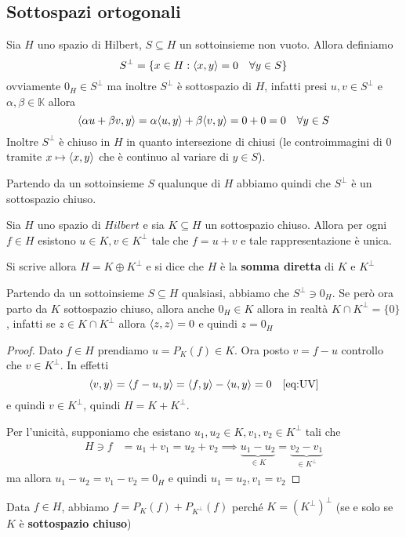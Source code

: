 \subsection{Sottospazi ortogonali}
Sia \(H\) uno spazio di Hilbert, \(S \subseteq H \) un sottoinsieme non vuoto.
Allora definiamo
\[
    S^\perp = \{x \in H : {\left\langle x, y\right\rangle} = 0 \quad \forall y \in S\} 
\]
ovviamente \(0_H \in S^\perp \) ma inoltre \(S^\perp \) è sottospazio di \(H\),
infatti presi \(u, v \in S^\perp \) e \(\alpha, \beta \in \mathbb{K}\) allora
\[
    {\left\langle\alpha u + \beta v, y\right\rangle} = \alpha {\left\langle u, y\right\rangle} + \beta {\left\langle v, y\right\rangle} = 0 +
    0 = 0 \quad \forall y \in S
\]
Inoltre \(S^\perp \) è chiuso in \(H\) in quanto intersezione di chiusi (le
controimmagini di 0 tramite \(x \mapsto {\left\langle x, y\right\rangle} \) che è continuo al variare
di \(y \in S\)).

Partendo da un sottoinsieme \(S\) qualunque di \(H\) abbiamo quindi che
\(S^\perp \) è un sottospazio chiuso.

\begin{theorem}\label{thm:dec_orto}
    Sia \(H\) uno spazio di \(Hilbert\) e sia \(K \subseteq H \) un sottospazio
    chiuso. Allora per ogni \(f \in H\) esistono \(u \in K, v \in K^\perp \)
    tale che \(f = u + v\) e tale rappresentazione è unica.
\end{theorem}
\begin{remark}
    Si scrive allora \(H = K \oplus K^\perp\) e si dice che \(H\) è la
    \textbf{somma diretta} di \(K\) e \(K^\perp\)
\end{remark}
\begin{remark}
    Partendo da un sottoinsieme \(S \subseteq H \) qualsiasi, abbiamo che
    \(S^\perp \ni 0_H\). Se però ora parto da \(K\) sottospazio chiuso, allora
    anche \(0_H \in K\) allora in realtà \(K \cap K^\perp = \{0\}\), infatti se
    \(z \in K \cap K^\perp \) allora \({\left\langle z, z\right\rangle} = 0\) e quindi \(z = 0_H\)
\end{remark}
\begin{proof}
    Dato \(f \in H\) prendiamo \(u = P_K{(f)} \in K\). Ora posto \(v = f - u\)
    controllo che \(v \in K^\perp \). In effetti
    \[
        {\left\langle v, y\right\rangle} = {\left\langle f - u, y\right\rangle} = {\left\langle f, y\right\rangle} - {\left\langle u, y\right\rangle} = 0 \quad\eqref{eq:UV}
    \]
    e quindi \(v \in K^\perp \), quindi \(H = K + K^\perp \).

    Per l'unicità, supponiamo che esistano \(u_1, u_{2} \in K, v_{1}, v_{2} \in
    K^\perp\) tali che 
    \begin{align*}
        H \ni f &= u_{1} + v_{1} = u_{2} + v_{2}
        \implies \underbrace{u_{1} - u_{2}}_{\in K}  = \underbrace{v_{2} -
        v_{1}}_{\in K^\perp}
    \end{align*}
    ma allora \(u_{1} - u_{2} = v_{1} - v_{2} = 0_H\) e quindi \(u_{1} = u_{2},
    v_{1} = v_{2}\)
\end{proof}
\begin{remark}
    Data \(f \in H\), abbiamo \(f = P_K{(f)} + P_{K^\perp } {(f)}\) perché \(K =
    {(K^\perp )}^\perp\) (se e solo se \(K\) è \textbf{sottospazio chiuso})
\end{remark}

